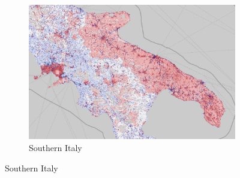             \begin{figure}[H]
                \begin{subfigure}{\textwidth}
                    \centering
                    \includegraphics[width=\linewidth,height=0.5\linewidth]{figs_06/osm_vs_cop_italy.png}
                    \caption{Southern Italy}
                    \label{fig:osm_vs_cop_italy}
                \end{subfigure}
                
                \vspace{1em} %
                

\end{figure}
